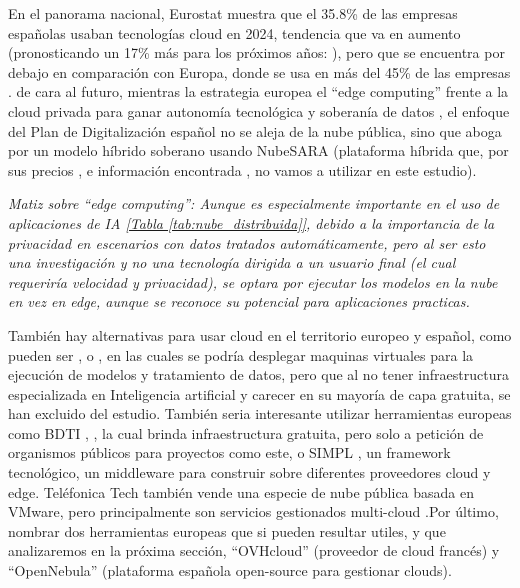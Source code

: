 En el panorama nacional, Eurostat muestra que el 35.8\% de las empresas españolas usaban tecnologías cloud en 2024, tendencia que va en aumento (pronosticando un 17\% más para los próximos años: \cite{EspannaCloudGroeth2033}), pero que se encuentra por debajo en comparación con Europa, donde se usa en más del 45\% de las empresas \citep{EurostatCloudUsage}. de cara al futuro, mientras la estrategia europea el ``edge computing'' frente a la cloud privada para ganar autonomía tecnológica y soberanía de datos \citep{EuroDigitalStrategyEdge}, el enfoque del Plan de Digitalización español \citep{GobEspana2021PlanDigitalizacion} no se aleja de la nube pública, sino que aboga por un modelo híbrido soberano usando NubeSARA (plataforma híbrida que, por sus precios \citep{EurostatCloudUsage}, e información encontrada \citep{InfoNubeSARA}, \citep{InfoPreparaTICNubeSARA} no vamos a utilizar en este estudio).

\emph{Matiz sobre ``edge computing'': Aunque es especialmente importante en el uso de aplicaciones de IA  \hyperref[tab:nube_distribuida]{[Tabla \ref*{tab:nube_distribuida}]}, debido a la importancia de la privacidad en escenarios con datos tratados automáticamente, pero al ser esto una investigación y no una tecnología dirigida a un usuario final (el cual requeriría velocidad y privacidad), se optara por ejecutar los modelos en la nube en vez en edge, aunque se reconoce su potencial para aplicaciones practicas.}

También hay alternativas para usar cloud en el territorio europeo y español, como pueden ser \citep{cloudingIO}, \citep{nextcloudCloud} o \citep{gigasCloud}, en las cuales se podría desplegar maquinas virtuales para la ejecución de modelos y tratamiento de datos, pero que al no tener infraestructura especializada en Inteligencia artificial y carecer en su mayoría de capa gratuita, se han excluido del estudio. También seria interesante utilizar herramientas europeas como BDTI \citep{BDTIEuropeProject}, \citep{GobEspana2021BDTI}, la cual brinda infraestructura gratuita, pero solo a petición de organismos públicos para proyectos como este, o SIMPL \citep{SIMPLEuropeProject}, un framework tecnológico, un middleware para construir sobre diferentes proveedores cloud y edge. Teléfonica Tech también vende una especie de nube pública basada en VMware, pero principalmente son servicios gestionados multi-cloud \citep{TelefonicaTechCloudPlatform}.Por último, nombrar dos herramientas europeas que si pueden resultar utiles, y que analizaremos en la próxima sección, ``OVHcloud'' (proveedor de cloud francés) y ``OpenNebula'' (plataforma española open-source para gestionar clouds). \\


